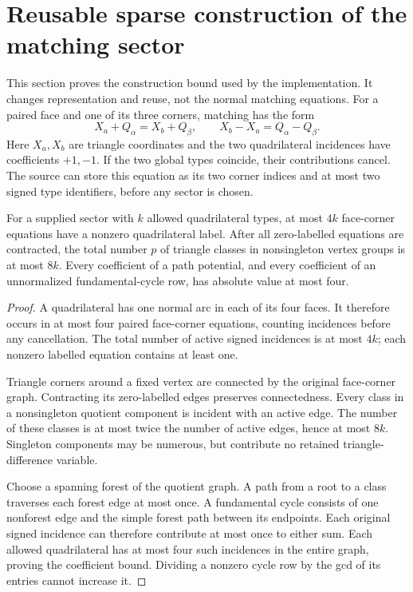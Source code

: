 \section{Reusable sparse construction of the matching sector}
\label{sec:sparse}

This section proves the construction bound used by the implementation.
It changes representation and reuse, not the normal matching equations.
For a paired face and one of its three corners, matching has the form
\[
 X_a+Q_\alpha=X_b+Q_\beta,
 \qquad X_b-X_a=Q_\alpha-Q_\beta.
\]
Here \(X_a,X_b\) are triangle coordinates and the two quadrilateral
incidences have coefficients \(+1,-1\).  If the two global types
coincide, their contributions cancel.  The source can store this
equation as its two corner indices and at most two signed type
identifiers, before any sector is chosen.

\begin{lemma}
\label{sp:incidences}
For a supplied sector with \(k\) allowed quadrilateral types, at most
\(4k\) face-corner equations have a nonzero quadrilateral label.
After all zero-labelled equations are contracted, the total number
\(p\) of triangle classes in nonsingleton vertex groups is at most
\(8k\).  Every coefficient of a path potential, and every coefficient
of an unnormalized fundamental-cycle row, has absolute value at most
four.
\end{lemma}
\begin{proof}
A quadrilateral has one normal arc in each of its four faces.
It therefore occurs in at most four paired face-corner equations,
counting incidences before any cancellation.  The total number of
active signed incidences is at most \(4k\); each nonzero labelled
equation contains at least one.

Triangle corners around a fixed vertex are connected by the original
face-corner graph.  Contracting its zero-labelled edges preserves
connectedness.  Every class in a nonsingleton quotient component is
incident with an active edge.  The number of these classes is at most
twice the number of active edges, hence at most \(8k\).
Singleton components may be numerous, but contribute no retained
triangle-difference variable.

Choose a spanning forest of the quotient graph.  A path from a root
to a class traverses each forest edge at most once.  A fundamental
cycle consists of one nonforest edge and the simple forest path
between its endpoints.  Each original signed incidence can therefore
contribute at most once to either sum.  Each allowed quadrilateral
has at most four such incidences in the entire graph, proving the
coefficient bound.  Dividing a nonzero cycle row by the gcd of its
entries cannot increase it.
\end{proof}

